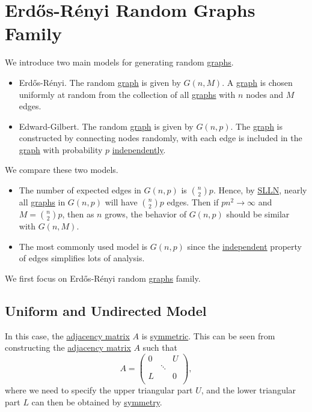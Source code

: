 \section{Erdős-Rényi Random Graphs Family}\label{sec:Erdos-Renyi-random-graphs-family}
We introduce two main models for generating random \hyperref[def:graph]{graphs}.
\begin{itemize}
	\item Erdős-Rényi. The random \hyperref[def:graph]{graph} is given by \(G(n, M)\).
	      A \hyperref[def:graph]{graph} is chosen uniformly at random from the collection
	      of all \hyperref[def:graph]{graphs} with \(n\) nodes and \(M\) edges.
	\item Edward-Gilbert. The random \hyperref[def:graph]{graph} is given by \(G(n, p)\).
	      The \hyperref[def:graph]{graph} is constructed by connecting nodes randomly, with
	      each edge is included in the \hyperref[def:graph]{graph} with probability \(p\) \hyperref[def:independent]{independently}.
\end{itemize}

\begin{remark}
	We compare these two models.
	\begin{itemize}
		\item The number of expected edges in \(G(n, p)\) is \(\binom{n}{2}p\). Hence, by \hyperref[thm:SLLN]{SLLN}, nearly all \hyperref[def:graph]{graphs}
		      in \(G(n, p)\) will have \(\binom{n}{2}p\) edges. Then if \(pn^{2} \to \infty \) and \(M = \binom{n}{2}p\), then as \(n\) grows, the behavior of
		      \(G(n, p)\) should be similar with \(G(n, M)\).
		\item The most commonly used model is \(G(n, p)\) since the \hyperref[def:independent]{independent} property of edges simplifies lots of analysis.
	\end{itemize}
\end{remark}

We first focus on Erdős-Rényi random \hyperref[def:graph]{graphs} family.
\subsection{Uniform and Undirected Model}\label{subsec:Uniform-and-Undirected-model}
In this case, the \hyperref[def:adjacency-matrix]{adjacency matrix} \(A\) is \hyperref[def:symmetric-matrix]{symmetric}.
This can be seen from constructing the \hyperref[def:adjacency-matrix]{adjacency matrix} \(A\) such that
\[
	A = \begin{pmatrix}
		0 &        & U \\
		  & \ddots &   \\
		L &        & 0 \\
	\end{pmatrix},
\]
where we need to specify the upper triangular part \(U\), and the lower triangular part \(L\) can then be obtained by \hyperref[def:symmetric-matrix]{symmetry}.

